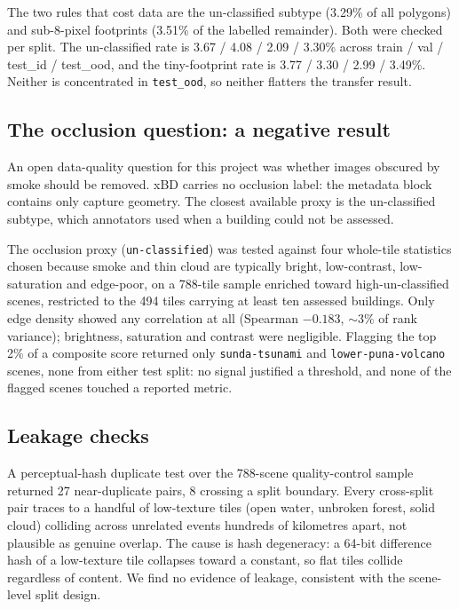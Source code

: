 \documentclass[10pt,twocolumn]{article}
\newcommand{\class}[1]{\textsf{#1}}
\begin{document}
The two rules that cost data are the \class{un-classified} subtype (3.29\% of all polygons) and
sub-8-pixel footprints (3.51\% of the labelled remainder). Both were checked per split. The
\class{un-classified} rate is 3.67 / 4.08 / 2.09 / 3.30\% across
train / val / test\_id / test\_ood, and the tiny-footprint rate is 3.77 / 3.30 / 2.99 / 3.49\%.
Neither is concentrated in \texttt{test\_ood}, so neither flatters the transfer result.

\subsection{The occlusion question: a negative result}

An open data-quality question for this project was whether images obscured by smoke should be
removed. xBD carries no occlusion label: the metadata block contains only capture geometry. The
closest available proxy is the \class{un-classified} subtype, which annotators used when a building
could not be assessed.

The occlusion proxy (\texttt{un-classified}) was tested against four whole-tile statistics chosen
because smoke and thin cloud are typically bright, low-contrast, low-saturation and edge-poor, on a
788-tile sample enriched toward high-un-classified scenes, restricted to the 494 tiles carrying at
least ten assessed buildings. Only edge density showed any correlation at all (Spearman $-0.183$,
${\sim}3\%$ of rank variance); brightness, saturation and contrast were negligible. Flagging the top
2\% of a composite score returned only \texttt{sunda-tsunami} and \texttt{lower-puna-volcano} scenes,
none from either test split: no signal justified a threshold, and none of the flagged scenes touched a
reported metric.

\subsection{Leakage checks}

A perceptual-hash duplicate test over the 788-scene quality-control sample returned 27 near-duplicate
pairs, 8 crossing a split boundary. Every cross-split pair traces to a handful of low-texture tiles
(open water, unbroken forest, solid cloud) colliding across unrelated events hundreds of kilometres
apart, not plausible as genuine overlap. The cause is hash degeneracy: a 64-bit difference hash of a
low-texture tile collapses toward a constant, so flat tiles collide regardless of content. We find no
evidence of leakage, consistent with the scene-level split design.
\end{document}
